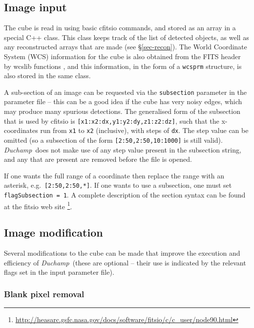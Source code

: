 \documentclass[12pt,a4paper]{article}
\newcommand{\eg}{e.g.\ }
\newcommand{\duchamp}{\emph{Duchamp}}
\begin{document}
\subsection{Image input}
\label{sec-input}

The cube is read in using basic {\sc cfitsio} commands, and stored as
an array in a special C++ class. This class keeps track of
the list of detected objects, as well as any reconstructed arrays that
are made (see \S\ref{sec-recon}). The World Coordinate System (WCS)
information for the cube is also obtained from the FITS header by {\sc
wcslib} functions \citep{greisen02, calabretta02}, and this
information, in the form of a \texttt{wcsprm} structure, is also stored
in the same class.

A sub-section of an image can be requested via the \texttt{subsection}
parameter in the parameter file -- this can be a good idea if the cube
has very noisy edges, which may produce many spurious detections. The
generalised form of the subsection that is used by {\sc cfitsio} is
\texttt{[x1:x2:dx,y1:y2:dy,z1:z2:dz]}, such that the x-coordinates run
from \texttt{x1} to \texttt{x2} (inclusive), with steps of
\texttt{dx}. The step value can be omitted (so a subsection of the
form \texttt{[2:50,2:50,10:1000]} is still valid). \duchamp\ does not
make use of any step value present in the subsection string, and any
that are present are removed before the file is opened.

If one wants the full range of a coordinate then replace the range
with an asterisk, \eg \texttt{[2:50,2:50,*]}. If one wants to use a
subsection, one must set \texttt{flagSubsection = 1}. A complete
description of the section syntax can be found at the {\sc fitsio} web
site
\footnote{
\href{http://heasarc.gsfc.nasa.gov/docs/software/fitsio/c/c\_user/node90.html}%
{http://heasarc.gsfc.nasa.gov/docs/software/fitsio/c/c\_user/node90.html}}.

\subsection{Image modification}
\label{sec-modify}

Several modifications to the cube can be made that improve the
execution and efficiency of \duchamp\ (these are optional -- their
use is indicated by the relevant flags set in the input parameter
file).

\subsubsection{Blank pixel removal}
\end{document}
